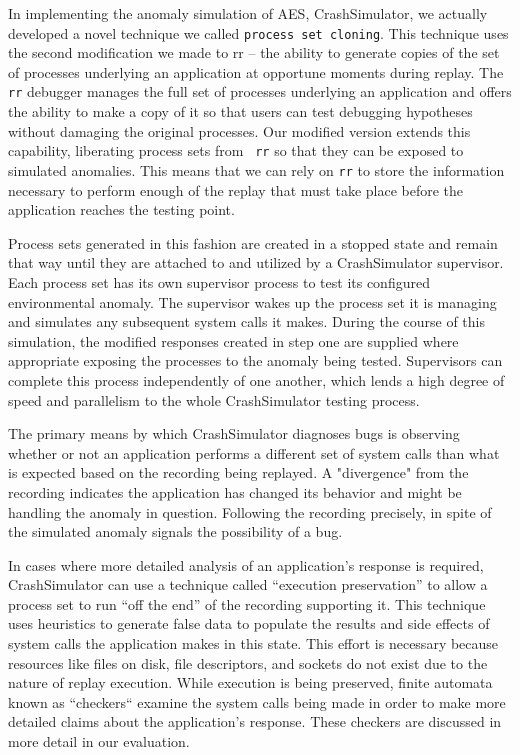 In implementing the anomaly simulation of AES,
CrashSimulator, we actually developed
a novel technique
we called {\tt process set cloning}.  This technique uses the second
modification we made to rr -- the ability to generate copies of the set of
processes underlying an application at opportune moments during replay.
The {\tt rr} debugger manages
the full set of processes underlying an application
and offers the ability to
make a copy of it so that users can test debugging
hypotheses without damaging the original processes.
Our modified version
extends this capability, liberating process sets from {\tt
rr} so that they can be exposed to simulated anomalies.
This means that we can rely on {\tt rr}
to store the information necessary to perform enough of the
replay that must take place before the application reaches the
testing point.

Process sets generated in this fashion are created in a stopped state and
remain that way until they are attached to and utilized by a CrashSimulator
supervisor.  Each process set has its own supervisor process to test
its configured environmental anomaly.  The
supervisor wakes up the process set it is managing and simulates any
subsequent system calls it makes.
During the course of this simulation, the modified responses created in
step one are supplied where appropriate exposing the processes to the
anomaly being tested.
Supervisors can complete this
process independently of one another, which lends a
high degree of speed and
parallelism to the whole CrashSimulator testing process.

The primary means by which
CrashSimulator diagnoses bugs is observing whether or not an application
performs a different set of system calls than what is expected based on the
recording being replayed.  A "divergence" from the recording indicates
the application has changed its behavior and might be handling
the anomaly in question.  Following the recording precisely, in spite of
the simulated anomaly signals the possibility of a bug.

In cases where more detailed analysis of an application's response
is required, CrashSimulator can use a
technique called ``execution preservation'' to allow a process set to run
``off the end'' of the recording supporting it.  This technique uses
heuristics to generate false data to populate the results and
side effects of system calls the application makes in this state.  This
effort is necessary because resources like files on disk, file descriptors,
and sockets do not exist due to the nature of replay execution.  While
execution is being preserved, finite automata known as ``checkers`` examine
the system calls being made in order to make more detailed claims about the
application's response.  These checkers are discussed in more detail in our
evaluation.
